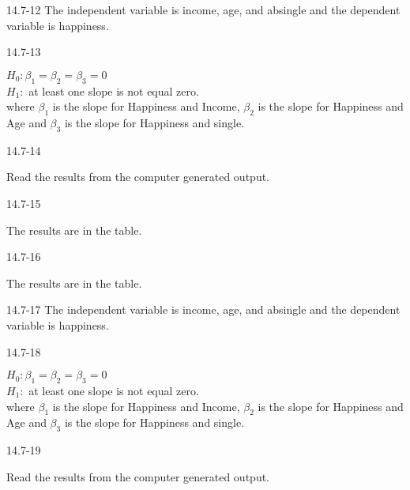 \begin{exsol@solution}{14.7-12}
       The independent variable is income,   age, and absingle and the dependent variable is happiness.
\end{exsol@solution}
\begin{exsol@solution}{14.7-13}

       $H_0: \beta_1 = \beta_2 = \beta_3 = 0$ \\
       $H_1:$ at least one slope is not equal zero. \\
       where $\beta_1$ is the slope for Happiness and Income,  $\beta_2$ is the slope for Happiness and Age and $\beta_3$ is         the slope for Happiness and single.

\end{exsol@solution}
\begin{exsol@solution}{14.7-14}

       Read the results from the computer generated output.

\end{exsol@solution}
\begin{exsol@solution}{14.7-15}

      The results are in the table.

\end{exsol@solution}
\begin{exsol@solution}{14.7-16}

  The results are in the table.

\end{exsol@solution}
\begin{exsol@solution}{14.7-17}
       The independent variable is income,   age, and absingle and the dependent variable is happiness.
\end{exsol@solution}
\begin{exsol@solution}{14.7-18}

       $H_0: \beta_1 = \beta_2 = \beta_3 = 0$ \\
       $H_1:$ at least one slope is not equal zero. \\
       where $\beta_1$ is the slope for Happiness and Income,  $\beta_2$ is the slope for Happiness and Age and $\beta_3$ is         the slope for Happiness and single.

\end{exsol@solution}
\begin{exsol@solution}{14.7-19}

       Read the results from the computer generated output.

\end{exsol@solution}
